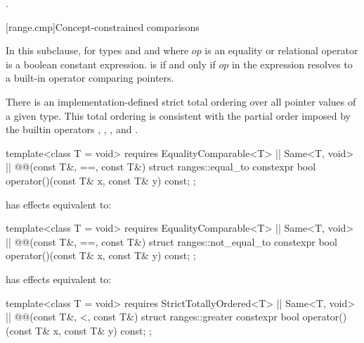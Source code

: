 \begin{itemdescr}
\pnum\returns {}.
\end{itemdescr}

[range.cmp]{Concept-constrained comparisons}

\pnum
In this subclause,  for types 
and  and where $op$ is an equality or relational
operator is a boolean constant expression.
 is  if and only if $op$
in the expression  resolves to a built-in
operator comparing pointers.

\pnum
There is an implementation-defined strict total ordering over all pointer values
of a given type. This total ordering is consistent with the partial order imposed
by the builtin operators \tcode{<}, \tcode{>}, \tcode{<=}, and \tcode{>=}.

%
\begin{itemdecl}
template<class T = void>
  requires EqualityComparable<T> || Same<T, void> || @@(const T&, ==, const T&)
struct ranges::equal_to {
  constexpr bool operator()(const T& x, const T& y) const;
};
\end{itemdecl}

\begin{itemdescr}
\pnum
{} has effects equivalent to:
\end{itemdescr}

%
\begin{itemdecl}
template<class T = void>
  requires EqualityComparable<T> || Same<T, void> || @@(const T&, ==, const T&)
struct ranges::not_equal_to {
  constexpr bool operator()(const T& x, const T& y) const;
};
\end{itemdecl}

\begin{itemdescr}
\pnum
{} has effects equivalent to:
\end{itemdescr}

%
\begin{itemdecl}
template<class T = void>
  requires StrictTotallyOrdered<T> || Same<T, void> || @@(const T&, <, const T&)
struct ranges::greater {
  constexpr bool operator()(const T& x, const T& y) const;
};
\end{itemdecl}

